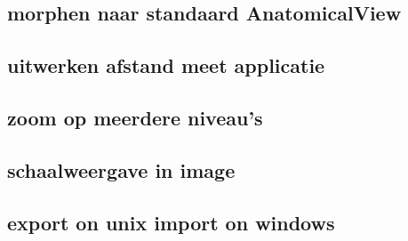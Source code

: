 \subsection{morphen naar standaard AnatomicalView}

\subsection{uitwerken afstand meet applicatie}

\subsection{zoom op meerdere niveau's}

\subsection{schaalweergave in image}

\subsection{export on unix import on windows}
